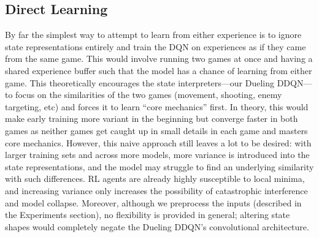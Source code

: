 \documentclass{article} %
\begin{document}
\subsection{Direct Learning}
By far the simplest way to attempt to learn from either experience is to ignore
state representations entirely and train the DQN on experiences as if they came from the same game.
This would involve running two games at once and having a shared experience buffer such that the
model has a chance of learning from either game. This theoretically encourages the state
interpreters---our Dueling DDQN---to focus on the similarities of the two games (movement, shooting,
enemy targeting, etc) and forces it to learn ``core mechanics'' first. In theory, this would make
early training more variant in the beginning but converge faster in both games as neither games get
caught up in small details in each game and masters core mechanics. However, this naive approach
still leaves a lot to be desired: with larger training sets and across more models, more variance is
introduced into the state representations, and the model may struggle to find an underlying
similarity with such differences. RL agents are already highly susceptible to local minima, and
increasing variance only increases the possibility of catastrophic interference and model collapse.
Moreover, although we preprocess the inputs (described in the Experiments section), no flexibility
is provided in general; altering state shapes would completely negate the Dueling DDQN's
convolutional architecture.
\end{document}
